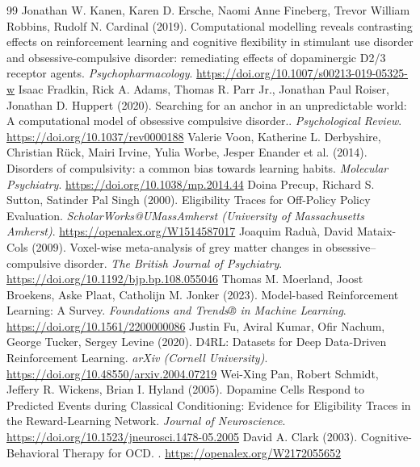 \documentclass[11pt,a4paper]{article}
\begin{document}
\begin{thebibliography}{99}
 Jonathan W. Kanen, Karen D. Ersche, Naomi Anne Fineberg, Trevor William Robbins, Rudolf N. Cardinal (2019). Computational modelling reveals contrasting effects on reinforcement learning and cognitive flexibility in stimulant use disorder and obsessive-compulsive disorder: remediating effects of dopaminergic D2/3 receptor agents. \emph{Psychopharmacology}. \url{https://doi.org/10.1007/s00213-019-05325-w}
 Isaac Fradkin, Rick A. Adams, Thomas R. Parr Jr., Jonathan Paul Roiser, Jonathan D. Huppert (2020). Searching for an anchor in an unpredictable world: A computational model of obsessive compulsive disorder.. \emph{Psychological Review}. \url{https://doi.org/10.1037/rev0000188}
 Valerie Voon, Katherine L. Derbyshire, Christian Rück, Mairi Irvine, Yulia Worbe, Jesper Enander et al. (2014). Disorders of compulsivity: a common bias towards learning habits. \emph{Molecular Psychiatry}. \url{https://doi.org/10.1038/mp.2014.44}
 Doina Precup, Richard S. Sutton, Satinder Pal Singh (2000). Eligibility Traces for Off-Policy Policy Evaluation. \emph{ScholarWorks@UMassAmherst (University of Massachusetts Amherst)}. \url{https://openalex.org/W1514587017}
 Joaquim Raduà, David Mataix-Cols (2009). Voxel-wise meta-analysis of grey matter changes in obsessive–compulsive disorder. \emph{The British Journal of Psychiatry}. \url{https://doi.org/10.1192/bjp.bp.108.055046}
 Thomas M. Moerland, Joost Broekens, Aske Plaat, Catholijn M. Jonker (2023). Model-based Reinforcement Learning: A Survey. \emph{Foundations and Trends® in Machine Learning}. \url{https://doi.org/10.1561/2200000086}
 Justin Fu, Aviral Kumar, Ofir Nachum, George Tucker, Sergey Levine (2020). D4RL: Datasets for Deep Data-Driven Reinforcement Learning. \emph{arXiv (Cornell University)}. \url{https://doi.org/10.48550/arxiv.2004.07219}
 Wei-Xing Pan, Robert Schmidt, Jeffery R. Wickens, Brian I. Hyland (2005). Dopamine Cells Respond to Predicted Events during Classical Conditioning: Evidence for Eligibility Traces in the Reward-Learning Network. \emph{Journal of Neuroscience}. \url{https://doi.org/10.1523/jneurosci.1478-05.2005}
 David A. Clark (2003). Cognitive-Behavioral Therapy for OCD. \emph{}. \url{https://openalex.org/W2172055652}

\end{thebibliography}
\end{document}

